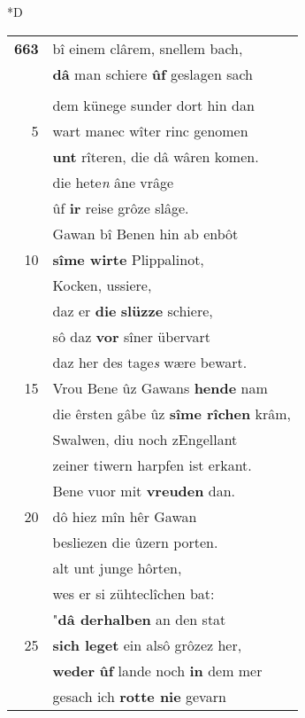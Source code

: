 \documentclass[8pt,a4paper,notitlepage]{article}
\begin{document}
\begin{table}[ht]
\begin{minipage}[t]{0.5\linewidth}
\small
\begin{center}*D
\end{center}
\begin{tabular}{rl}
\textbf{663} & bî einem clârem, snellem bach,\\ 
 & \textbf{dâ} man schiere \textbf{ûf} geslagen sach\\ 
 & \textit{\begin{large}M\end{large}}anec \textbf{zelt} wolgetân.\\ 
 & dem künege sunder dort hin dan\\ 
5 & wart manec wîter rinc genomen\\ 
 & \textbf{unt} rîteren, die dâ wâren komen.\\ 
 & die hete\textit{n} âne vrâge\\ 
 & ûf \textbf{ir} reise grôze slâge.\\ 
 & Gawan bî Benen hin ab enbôt\\ 
10 & \textbf{sîme wirte} Plippalinot,\\ 
 & Kocken, ussiere,\\ 
 & daz er \textbf{die} \textbf{slüzze} schiere,\\ 
 & sô daz \textbf{vor} sîner übervart\\ 
 & daz her des tage\textit{s} wære bewart.\\ 
15 & Vrou Bene ûz Gawans \textbf{hende} nam\\ 
 & die êrsten gâbe ûz \textbf{sîme rîchen} krâm,\\ 
 & Swalwen, diu noch zEngellant\\ 
 & zeiner tiwern harpfen ist erkant.\\ 
 & Bene vuor mit \textbf{vreuden} dan.\\ 
20 & dô hiez mîn hêr Gawan\\ 
 & besliezen die ûzern porten.\\ 
 & alt unt junge hôrten,\\ 
 & wes er si zühteclîchen bat:\\ 
 & "\textbf{dâ derhalben} an den stat\\ 
25 & \textbf{sich leget} ein alsô grôzez her,\\ 
 & \textbf{weder} \textbf{ûf} lande noch \textbf{in} dem mer\\ 
 & gesach ich \textbf{rotte nie} gevarn\\ 

\end{tabular}
\end{minipage}
\end{table}
\end{document}
